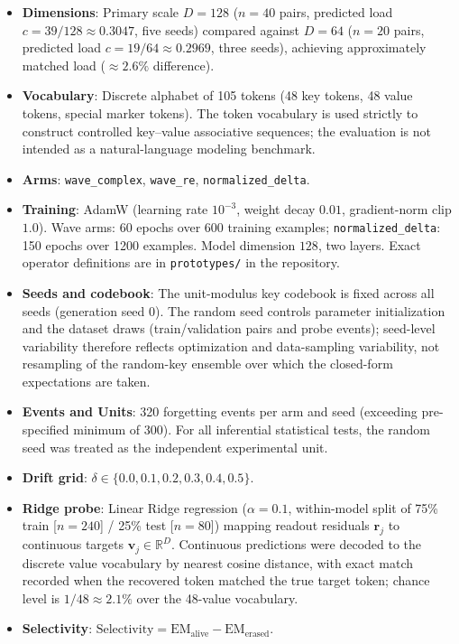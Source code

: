 \documentclass[11pt,a4paper]{article}
\newcommand{\R}{\mathbb{R}}
\begin{document}
\begin{itemize}
  \item \textbf{Dimensions}: Primary scale $D=128$ ($n=40$ pairs, predicted load $c=39/128 \approx 0.3047$, five seeds) compared against $D=64$ ($n=20$ pairs, predicted load $c=19/64 \approx 0.2969$, three seeds), achieving approximately matched load ($\approx 2.6\%$ difference).
  \item \textbf{Vocabulary}: Discrete alphabet of 105 tokens (48 key tokens, 48 value tokens, special marker tokens). The token vocabulary is used strictly to construct controlled key--value associative sequences; the evaluation is not intended as a natural-language modeling benchmark.
  \item \textbf{Arms}: \texttt{wave\_complex}, \texttt{wave\_re}, \texttt{normalized\_delta}.
  \item \textbf{Training}: AdamW (learning rate $10^{-3}$, weight decay $0.01$, gradient-norm clip $1.0$). Wave arms: 60 epochs over 600 training examples; \texttt{normalized\_delta}: 150 epochs over 1200 examples. Model dimension $128$, two layers. Exact operator definitions are in \texttt{prototypes/} in the repository.
  \item \textbf{Seeds and codebook}: The unit-modulus key codebook is fixed across all seeds (generation seed $0$). The random seed controls parameter initialization and the dataset draws (train/validation pairs and probe events); seed-level variability therefore reflects optimization and data-sampling variability, not resampling of the random-key ensemble over which the closed-form expectations are taken.
  \item \textbf{Events and Units}: 320 forgetting events per arm and seed (exceeding pre-specified minimum of 300). For all inferential statistical tests, the random seed was treated as the independent experimental unit.
  \item \textbf{Drift grid}: $\delta \in \{0.0, 0.1, 0.2, 0.3, 0.4, 0.5\}$.
  \item \textbf{Ridge probe}: Linear Ridge regression ($\alpha=0.1$, within-model split of 75\% train [$n=240$] / 25\% test [$n=80$]) mapping readout residuals $\mathbf{r}_j$ to continuous targets $\mathbf{v}_j \in \R^D$. Continuous predictions were decoded to the discrete value vocabulary by nearest cosine distance, with exact match recorded when the recovered token matched the true target token; chance level is $1/48 \approx 2.1\%$ over the 48-value vocabulary.
  \item \textbf{Selectivity}: $\text{Selectivity} = \mathrm{EM}_{\text{alive}} - \mathrm{EM}_{\text{erased}}$.

\end{itemize}
\end{document}
